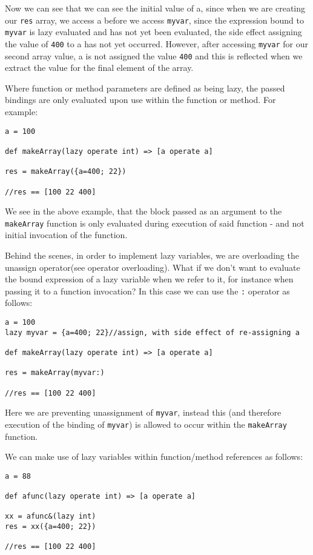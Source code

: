 \documentclass[conc-doc]{subfiles}
\begin{document}
Now we can see that we can see the initial value of a, since when we are creating our \lstinline{res} array, we access a before we access \lstinline{myvar}, since the expression bound to \lstinline{myvar} is lazy evaluated and has not yet been evaluated, the side effect assigning the value of \lstinline{400} to a has not yet occurred. However, after accessing \lstinline{myvar} for our second array value, a is not assigned the value \lstinline{400} and this is reflected when we extract the value for the final element of the array.

Where function or method parameters are defined as being lazy, the passed bindings are only evaluated upon use within the function or method. For example:
\begin{lstlisting}
a = 100

def makeArray(lazy operate int) => [a operate a]

res = makeArray({a=400; 22})

//res == [100 22 400]
\end{lstlisting}

We see in the above example, that the block passed as an argument to the \lstinline{makeArray} function is only evaluated during execution of said function - and not initial invocation of the function.

Behind the scenes, in order to implement lazy variables, we are overloading the unassign operator(see operator overloading). What if we don't want to evaluate the bound expression of a lazy variable when we refer to it, for instance when passing it to a function invocation? In this case we can use the \lstinline{:} operator as follows:
\begin{lstlisting}
a = 100
lazy myvar = {a=400; 22}//assign, with side effect of re-assigning a

def makeArray(lazy operate int) => [a operate a]

res = makeArray(myvar:)

//res == [100 22 400]
\end{lstlisting}

Here we are preventing unassignment of \lstinline{myvar}, instead this (and therefore execution of the binding of \lstinline{myvar}) is allowed to occur within the \lstinline{makeArray} function.

We can make use of lazy variables within function/method references as follows:

\begin{lstlisting}
a = 88

def afunc(lazy operate int) => [a operate a]

xx = afunc&(lazy int)
res = xx({a=400; 22})

//res == [100 22 400]
\end{lstlisting}
\end{document}
